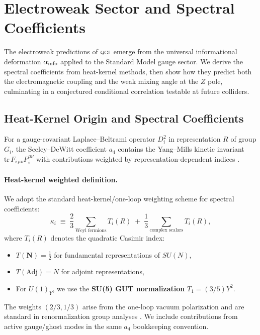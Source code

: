 \documentclass{article}
\numberwithin{equation}{section}
\theoremstyle{plain}
\theoremstyle{definition}
\theoremstyle{remark}
\newcommand{\qgi}{\textsc{qgi}}
\begin{document}
\section{Electroweak Sector and Spectral Coefficients}
\label{sec:ew}

The electroweak predictions of \qgi\ emerge from the universal informational deformation $\alpha_{\rm info}$ applied to the Standard Model gauge sector. We derive the spectral coefficients from heat-kernel methods, then show how they predict both the electromagnetic coupling and the weak mixing angle at the $Z$ pole, culminating in a conjectured conditional correlation testable at future colliders.

\subsection{Heat-Kernel Origin and Spectral Coefficients}
\label{subsec:heat_kernel}

For a gauge-covariant Laplace--Beltrami operator $D_i^2$ in representation $R$ of group $G_i$, the Seeley--DeWitt coefficient $a_4$ contains the Yang--Mills kinetic invariant $\mathrm{tr}\,F_{i\,\mu\nu}F_i^{\mu\nu}$ with contributions weighted by representation-dependent indices \cite{DeWitt1965,Gilkey1984,Vassilevich2003}.

\paragraph{Heat-kernel weighted definition.}
We adopt the standard heat-kernel/one-loop weighting scheme for spectral coefficients:
\begin{equation}
\kappa_i \;\equiv\; \frac{2}{3}\sum_{\text{Weyl fermions}} T_i(R) \;+\; \frac{1}{3}\sum_{\text{complex scalars}} T_i(R),
\label{eq:kappa_def}
\end{equation}
where $T_i(R)$ denotes the quadratic Casimir index:
\begin{itemize}
    \item $T(\mathbf{N}) = \tfrac{1}{2}$ for fundamental representations of $SU(N)$,
    \item $T(\text{Adj}) = N$ for adjoint representations,
    \item For $U(1)_Y$, we use the \textbf{SU(5) GUT normalization} $T_1 = (3/5)Y^2$.
\end{itemize}

The weights $(2/3, 1/3)$ arise from the one-loop vacuum polarization and are standard in renormalization group analyses \cite{Machacek1983,Machacek1984}. We include contributions from active gauge/ghost modes in the same $a_4$ bookkeeping convention.
\end{document}
